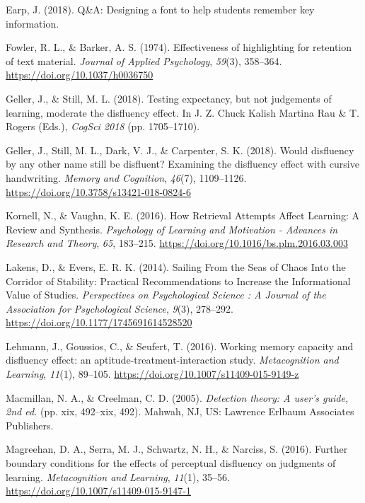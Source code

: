 \documentclass[
  english,
  jou]{apa6}
\begin{document}
\leavevmode\hypertarget{ref-Earp2018}{}%
Earp, J. (2018). Q\&A: Designing a font to help students remember key information.

\leavevmode\hypertarget{ref-Fowler1974}{}%
Fowler, R. L., \& Barker, A. S. (1974). Effectiveness of highlighting for retention of text material. \emph{Journal of Applied Psychology}, \emph{59}(3), 358--364. \url{https://doi.org/10.1037/h0036750}

\leavevmode\hypertarget{ref-cogsci18-Geller}{}%
Geller, J., \& Still, M. L. (2018). Testing expectancy, but not judgements of learning, moderate the disfluency effect. In J. Z. Chuck Kalish Martina Rau \& T. Rogers (Eds.), \emph{CogSci 2018} (pp. 1705--1710).

\leavevmode\hypertarget{ref-Geller2018}{}%
Geller, J., Still, M. L., Dark, V. J., \& Carpenter, S. K. (2018). Would disfluency by any other name still be disfluent? Examining the disfluency effect with cursive handwriting. \emph{Memory and Cognition}, \emph{46}(7), 1109--1126. \url{https://doi.org/10.3758/s13421-018-0824-6}

\leavevmode\hypertarget{ref-Kornell2016}{}%
Kornell, N., \& Vaughn, K. E. (2016). How Retrieval Attempts Affect Learning: A Review and Synthesis. \emph{Psychology of Learning and Motivation - Advances in Research and Theory}, \emph{65}, 183--215. \url{https://doi.org/10.1016/bs.plm.2016.03.003}

\leavevmode\hypertarget{ref-Lakens2014}{}%
Lakens, D., \& Evers, E. R. K. (2014). Sailing From the Seas of Chaos Into the Corridor of Stability: Practical Recommendations to Increase the Informational Value of Studies. \emph{Perspectives on Psychological Science : A Journal of the Association for Psychological Science}, \emph{9}(3), 278--292. \url{https://doi.org/10.1177/1745691614528520}

\leavevmode\hypertarget{ref-Lehmann2016}{}%
Lehmann, J., Goussios, C., \& Seufert, T. (2016). Working memory capacity and disfluency effect: an aptitude-treatment-interaction study. \emph{Metacognition and Learning}, \emph{11}(1), 89--105. \url{https://doi.org/10.1007/s11409-015-9149-z}

\leavevmode\hypertarget{ref-Macmillan2005}{}%
Macmillan, N. A., \& Creelman, C. D. (2005). \emph{Detection theory: A user's guide, 2nd ed.} (pp. xix, 492--xix, 492). Mahwah, NJ, US: Lawrence Erlbaum Associates Publishers.

\leavevmode\hypertarget{ref-Magreehan2016}{}%
Magreehan, D. A., Serra, M. J., Schwartz, N. H., \& Narciss, S. (2016). Further boundary conditions for the effects of perceptual disfluency on judgments of learning. \emph{Metacognition and Learning}, \emph{11}(1), 35--56. \url{https://doi.org/10.1007/s11409-015-9147-1}
\end{document}
